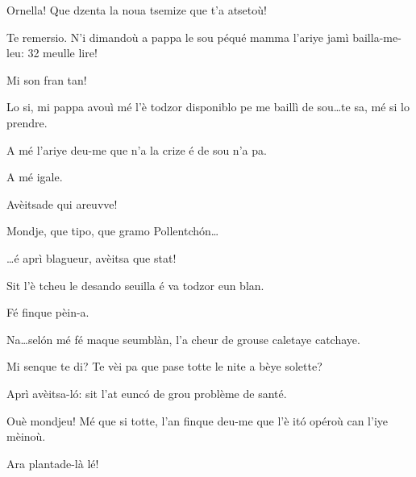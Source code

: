 \begin{drama}


\Vandaspeaks	Ornella! Que dzenta la noua tsemize que t’a atsetoù!

\Ornellaspeaks Te remersio. N’i dimandoù a pappa le sou péqué mamma l’ariye jamì bailla-me-leu: 32 meulle lire!

\Vandaspeaks	Mi son fran tan!
 
\Ornellaspeaks	 Lo si, mi pappa avouì mé l'è todzor disponiblo pe me baillì de sou\ldots te sa, mé si lo prendre.

\Vilmaspeaks A mé l’ariye deu-me que n’a la crize é de sou n'a pa.

\Vandaspeaks	A mé igale.

\Ornellaspeaks{} Avèitsade qui areuvve!


\Vandaspeaks	Mondje, que tipo, que gramo Pollentch\'on\ldots

\Ornellaspeaks	 \ldots é aprì blagueur, avèitsa que stat!


\Vandaspeaks	Sit l’è tcheu le desando seuilla é va todzor eun blan.

\Ornellaspeaks Fé finque pèin-a.

\Vilmaspeaks Na\ldots sel\'on mé fé maque seumblàn, l’a cheur de grouse caletaye catchaye.

\Ornellaspeaks Mi senque te di? Te vèi pa que pase totte le nite a bèye solette?

\Vandaspeaks{} Aprì avèitsa-l\'o: sit l’at eunc\'o de grou problème de santé.


\Ornellaspeaks Ouè mondjeu! Mé que si totte, l’an finque deu-me que l’è it\'o opéroù can l'iye mèinoù.

\Vilmaspeaks{} Ara plantade-là lé!


\end{drama}
